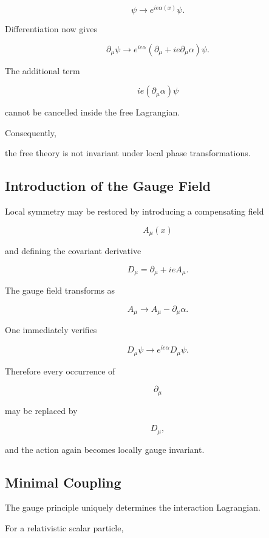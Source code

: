 \[
\boxed{
\psi
\rightarrow
e^{ie\alpha(x)}
\psi.
}
\]

Differentiation now gives

\[
\partial_\mu\psi
\rightarrow
e^{ie\alpha}
\left(
\partial_\mu
+
ie\partial_\mu\alpha
\right)\psi.
\]

The additional term

\[
ie(\partial_\mu\alpha)\psi
\]

cannot be cancelled inside the free Lagrangian.

Consequently,

the free theory is not invariant under local phase transformations.


\subsection{Introduction of the Gauge Field}

Local symmetry may be restored by introducing a compensating field

\[
A_\mu(x)
\]

and defining the covariant derivative

\[
\boxed{
D_\mu
=
\partial_\mu
+
ieA_\mu.
}
\]

The gauge field transforms as

\[
\boxed{
A_\mu
\rightarrow
A_\mu
-
\partial_\mu\alpha.
}
\]

One immediately verifies

\[
D_\mu\psi
\rightarrow
e^{ie\alpha}
D_\mu\psi.
\]

Therefore every occurrence of

\[
\partial_\mu
\]

may be replaced by

\[
D_\mu,
\]

and the action again becomes locally gauge invariant.


\subsection{Minimal Coupling}

The gauge principle uniquely determines the interaction Lagrangian.

For a relativistic scalar particle,

